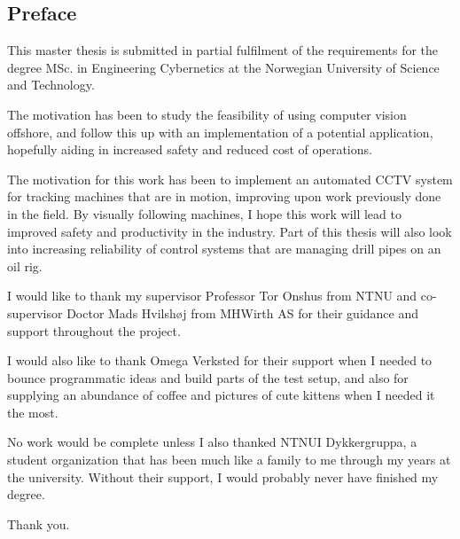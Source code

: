 \subsection*{Preface}
This master thesis is submitted in partial fulfilment of the requirements for the degree MSc. in Engineering Cybernetics at the Norwegian University of Science and Technology.

The motivation has been to study the feasibility of using computer vision offshore, and follow this up with an implementation of a potential application, hopefully aiding in increased safety and reduced cost of operations.

The motivation for this work has been to implement an automated CCTV system for tracking machines that are in motion, improving upon work previously done in the field. By visually following machines, I hope this work will lead to improved safety and productivity in the industry. Part of this thesis will also look into increasing reliability of control systems that are managing drill pipes on an oil rig.

I would like to thank my supervisor Professor Tor Onshus from NTNU and co-supervisor Doctor Mads Hvilshøj from MHWirth AS for their guidance and support throughout the project.

I would also like to thank Omega Verksted for their support when I needed to bounce programmatic ideas and build parts of the test setup, and also for supplying an abundance of coffee and pictures of cute kittens when I needed it the most.

No work would be complete unless I also thanked NTNUI Dykkergruppa, a student organization that has been much like a family to me through my years at the university. Without their support, I would probably never have finished my degree.

Thank you.

\newpage
